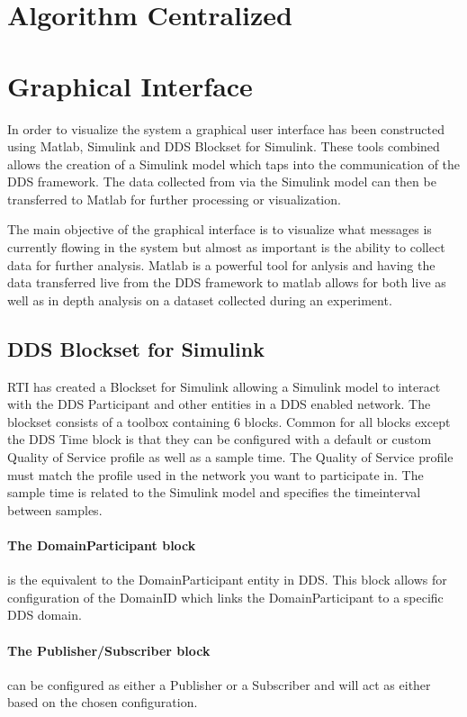 \section{Algorithm Centralized}\label{sec:algoCen} 


\section{Graphical Interface}
In order to visualize the system a graphical user interface has been constructed using Matlab, Simulink and DDS Blockset for Simulink.
These tools combined allows the creation of a Simulink model which taps into the communication of the DDS framework.
The data collected from via the Simulink model can then be transferred to Matlab for further processing or visualization.

The main objective of the graphical interface is to visualize what messages is currently flowing in the system but almost as important is the ability to collect data for further analysis.
Matlab is a powerful tool for anlysis and having the data transferred live from the DDS framework to matlab allows for both live as well as in depth analysis on a dataset collected during an experiment.

\subsection{DDS Blockset for Simulink}
RTI has created a Blockset for Simulink allowing a Simulink model to interact with the DDS Participant and other entities in a DDS enabled network.
The blockset consists of a toolbox containing 6 blocks. Common for all blocks except the DDS Time block is that they can be configured with a default or custom Quality of Service profile as well as a sample time. The Quality of Service profile must match the profile used in the network you want to participate in. The sample time is related to the Simulink model and specifies the timeinterval between samples.

\paragraph{The DomainParticipant block} is the equivalent to the DomainParticipant entity in DDS. This block allows for configuration of the DomainID which links the DomainParticipant to a specific DDS domain.

\paragraph{The Publisher/Subscriber block} can be configured as either a Publisher or a Subscriber and will act as either based on the chosen configuration.

